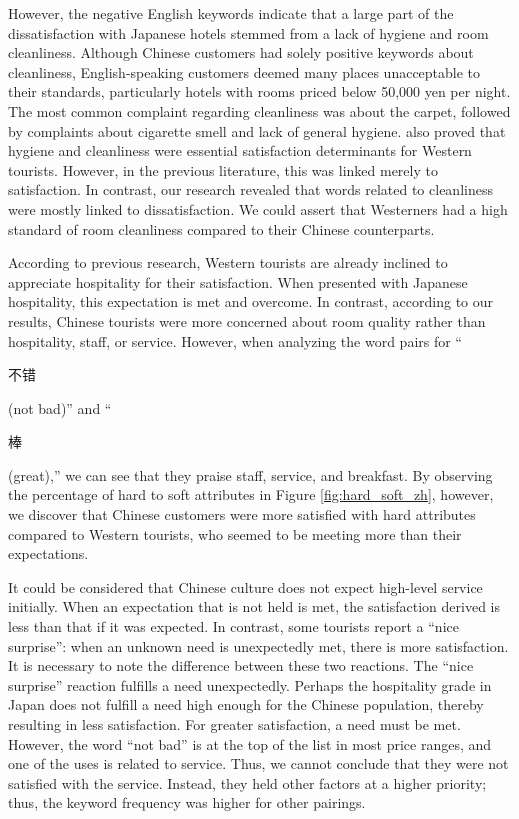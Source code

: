 \documentclass[smallextended,natbib]{svjour3}       %
\begin{document}
    However, the negative English keywords indicate that a large part of the dissatisfaction with Japanese hotels stemmed from a lack of hygiene and room cleanliness. Although Chinese customers had solely positive keywords about cleanliness, English-speaking customers deemed many places unacceptable to their standards, particularly hotels with rooms priced below 50,000 yen per night. The most common complaint regarding cleanliness was about the carpet, followed by complaints about cigarette smell and lack of general hygiene. \cite{kozak2002} also proved that hygiene and cleanliness were essential satisfaction determinants for Western tourists. However, in the previous literature, this was linked merely to satisfaction. In contrast, our research revealed that words related to cleanliness were mostly linked to dissatisfaction. We could assert that Westerners had a high standard of room cleanliness compared to their Chinese counterparts.

    According to previous research, Western tourists are already inclined to appreciate hospitality for their satisfaction. When presented with Japanese hospitality, this expectation is met and overcome. In contrast, according to our results, Chinese tourists were more concerned about room quality rather than hospitality, staff, or service. However, when analyzing the word pairs for ``\begin{CJK}{UTF8}{gbsn}不错\end{CJK} (not bad)'' and ``\begin{CJK}{UTF8}{gbsn}棒\end{CJK} (great),'' we can see that they praise staff, service, and breakfast. By observing the percentage of hard to soft attributes in Figure \ref{fig:hard_soft_zh}, however, we discover that Chinese customers were more satisfied with hard attributes compared to Western tourists, who seemed to be meeting more than their expectations.

    It could be considered that Chinese culture does not expect high-level service initially. When an expectation that is not held is met, the satisfaction derived is less than that if it was expected. In contrast, some tourists report a ``nice surprise'': when an unknown need is unexpectedly met, there is more satisfaction. It is necessary to note the difference between these two reactions. The ``nice surprise'' reaction fulfills a need unexpectedly. Perhaps the hospitality grade in Japan does not fulfill a need high enough for the Chinese population, thereby resulting in less satisfaction. For greater satisfaction, a need must be met. However, the word ``not bad'' is at the top of the list in most price ranges, and one of the uses is related to service. Thus, we cannot conclude that they were not satisfied with the service. Instead, they held other factors at a higher priority; thus, the keyword frequency was higher for other pairings.
\end{document}
